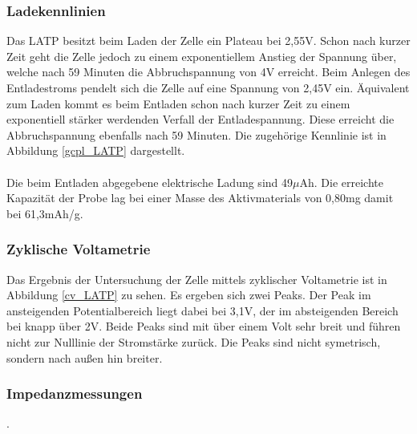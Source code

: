 \documentclass[a4paper, 11pt, headsepline,footsepline,twoside,abstract]{scrbook}
\begin{document}
\subsubsection{Ladekennlinien}
Das LATP besitzt beim Laden der Zelle ein Plateau bei 2,55V. Schon nach kurzer Zeit geht die Zelle jedoch zu einem exponentiellem Anstieg der Spannung über, welche nach 59 Minuten die Abbruchspannung von 4V erreicht. Beim Anlegen des Entladestroms pendelt sich die Zelle auf eine Spannung von 2,45V ein. Äquivalent zum Laden kommt es beim Entladen schon nach kurzer Zeit zu einem exponentiell stärker werdenden Verfall der Entladespannung. Diese erreicht die Abbruchspannung ebenfalls nach 59 Minuten. Die zugehörige Kennlinie ist in Abbildung \ref{gcpl_LATP} dargestellt. 
\\\\
Die beim Entladen abgegebene elektrische Ladung sind 49$\mu$Ah. Die erreichte Kapazität der Probe lag bei einer Masse des Aktivmaterials von 0,80mg damit bei 61,3mAh/g. 
\subsubsection{Zyklische Voltametrie}
Das Ergebnis der Untersuchung der Zelle mittels zyklischer Voltametrie ist in Abbildung \ref{cv_LATP} zu sehen. Es ergeben sich zwei Peaks. Der Peak im ansteigenden Potentialbereich liegt dabei bei 3,1V, der im absteigenden Bereich bei knapp über 2V. Beide Peaks sind mit über einem Volt sehr breit und führen nicht zur Nulllinie der Stromstärke zurück. Die Peaks sind nicht symetrisch, sondern nach außen hin breiter.
\subsubsection{Impedanzmessungen}
.
\newpage
\end{document}
